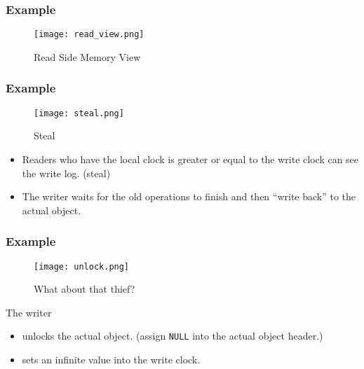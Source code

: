 \documentclass{beamer}
\begin{document}

\begin{frame}[t]
  \frametitle{Example}

  \begin{figure}[ht]
    \centering
    \texttt{[image: read\_view.png]}
    \caption{Read Side Memory View}
  \end{figure}
  
\end{frame}


\begin{frame}[t]
  \frametitle{Example}

  \begin{figure}[ht]
    \centering
    \texttt{[image: steal.png]}
    \caption{Steal}
  \end{figure}

  \begin{itemize}
  \item Readers who have the local clock is greater or equal to the write clock
    can see the write log. (steal)
  \item The writer waits for the old operations to finish and then ``write back''
    to the actual object.
  \end{itemize}
  
\end{frame}


\begin{frame}[t]
  \frametitle{Example}

  \begin{figure}[t]
    \centering
    \texttt{[image: unlock.png]}
    \caption{What about that thief?}
  \end{figure}

  The writer
  \begin{itemize}
  \item unlocks the actual object. (assign \texttt{NULL} into the actual object header.)
  \item sets an infinite value into the write clock.
  \end{itemize}
  
\end{frame}

\end{document}
